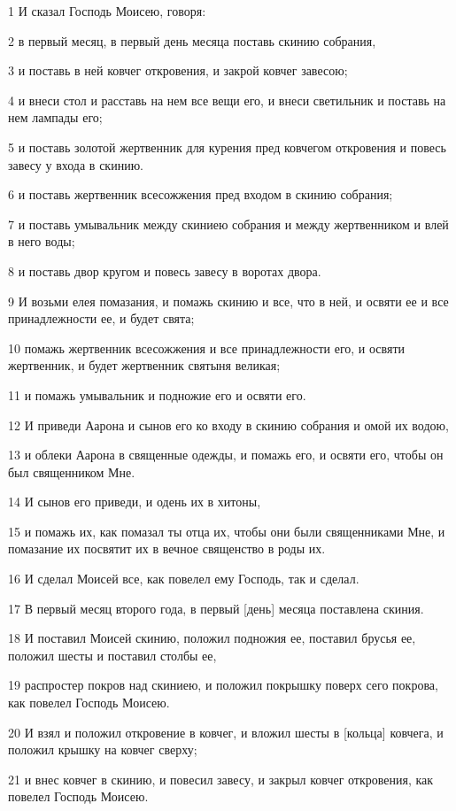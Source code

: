 \par 1 И сказал Господь Моисею, говоря:
\par 2 в первый месяц, в первый день месяца поставь скинию собрания,
\par 3 и поставь в ней ковчег откровения, и закрой ковчег завесою;
\par 4 и внеси стол и расставь на нем все вещи его, и внеси светильник и поставь на нем лампады его;
\par 5 и поставь золотой жертвенник для курения пред ковчегом откровения и повесь завесу у входа в скинию.
\par 6 и поставь жертвенник всесожжения пред входом в скинию собрания;
\par 7 и поставь умывальник между скиниею собрания и между жертвенником и влей в него воды;
\par 8 и поставь двор кругом и повесь завесу в воротах двора.
\par 9 И возьми елея помазания, и помажь скинию и все, что в ней, и освяти ее и все принадлежности ее, и будет свята;
\par 10 помажь жертвенник всесожжения и все принадлежности его, и освяти жертвенник, и будет жертвенник святыня великая;
\par 11 и помажь умывальник и подножие его и освяти его.
\par 12 И приведи Аарона и сынов его ко входу в скинию собрания и омой их водою,
\par 13 и облеки Аарона в священные одежды, и помажь его, и освяти его, чтобы он был священником Мне.
\par 14 И сынов его приведи, и одень их в хитоны,
\par 15 и помажь их, как помазал ты отца их, чтобы они были священниками Мне, и помазание их посвятит их в вечное священство в роды их.
\par 16 И сделал Моисей все, как повелел ему Господь, так и сделал.
\par 17 В первый месяц второго года, в первый [день] месяца поставлена скиния.
\par 18 И поставил Моисей скинию, положил подножия ее, поставил брусья ее, положил шесты и поставил столбы ее,
\par 19 распростер покров над скиниею, и положил покрышку поверх сего покрова, как повелел Господь Моисею.
\par 20 И взял и положил откровение в ковчег, и вложил шесты в [кольца] ковчега, и положил крышку на ковчег сверху;
\par 21 и внес ковчег в скинию, и повесил завесу, и закрыл ковчег откровения, как повелел Господь Моисею.
